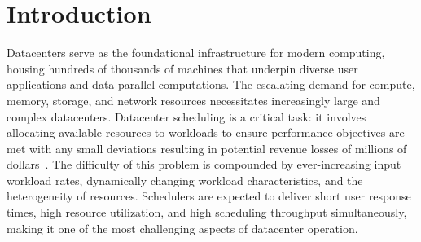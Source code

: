 \chapter{Introduction}
\label{firstcontentpage} %

%
%

%

Datacenters serve as the foundational infrastructure for modern computing,
housing hundreds of thousands of machines that underpin diverse user
applications and data-parallel computations. The escalating demand for compute,
memory, storage, and network resources necessitates increasingly large and
complex datacenters. Datacenter scheduling is a critical task: it involves
allocating available resources to workloads to ensure performance objectives
are met with any small deviations resulting in potential revenue losses of
millions of dollars~\cite{}. The difficulty of this problem is compounded by
ever-increasing input workload rates, dynamically changing workload
characteristics, and the heterogeneity of resources. Schedulers are expected to
deliver short user response times, high resource utilization, and high
scheduling throughput simultaneously, making it one of the most challenging
aspects of datacenter operation.

